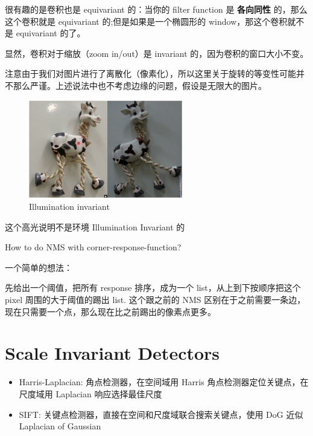很有趣的是卷积也是 equivariant 的：当你的 filter function 是 \textbf{各向同性} 的，那么这个卷积就是 equivariant 的;但是如果是一个椭圆形的 window，那这个卷积就不是 equivariant 的了。

显然，卷积对于缩放（zoom in/out）是 invariant 的，因为卷积的窗口大小不变。

注意由于我们对图片进行了离散化（像素化），所以这里关于旋转的等变性可能并不那么严谨。上述说法中也不考虑边缘的问题，假设是无限大的图片。

\newpage

\begin{figure}[htbp]
    \centering
    \includegraphics[width=0.6\textwidth]{figures/light_invariant.png}
    \caption{Illumination invariant}
\end{figure}
\begin{remark}
    这个高光说明不是环境 Illumination Invariant 的
\end{remark}


\begin{problem}
    How to do NMS with corner-response-function?
\end{problem}


一个简单的想法：

先给出一个阈值，把所有 response 排序，成为一个 list，从上到下按顺序把这个 pixel 周围的大于阈值的踢出 list.
这个跟之前的 NMS 区别在于之前需要一条边，现在只需要一个点，那么现在比之前踢出的像素点更多。

\section{Scale Invariant Detectors}
\begin{itemize}
    \item Harris-Laplacian: 角点检测器，在空间域用 Harris 角点检测器定位关键点，在尺度域用 Laplacian 响应选择最佳尺度
    \item SIFT: 关键点检测器，直接在空间和尺度域联合搜索关键点，使用 DoG 近似 Laplacian of Gaussian
\end{itemize}
